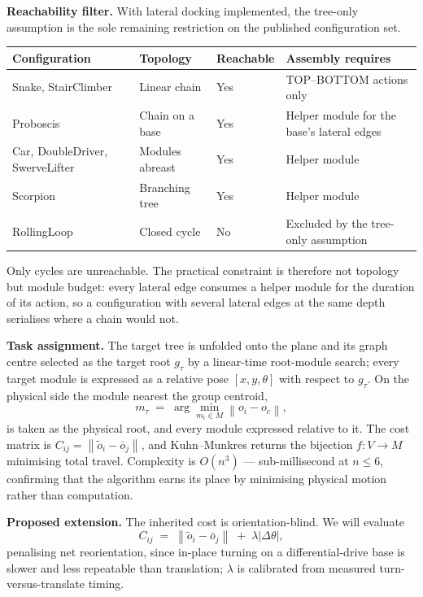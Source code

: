 \documentclass[11pt,a4paper]{article}
\newif\ifreview
\newcommand{\pending}[1]{\ifreview{\color{blue}#1}\else#1\fi}
\newenvironment{pblock}{\ifreview\color{blue}\fi}{}
\begin{document}
\medskip
\noindent\textbf{Reachability filter.} With lateral docking implemented, the
tree-only assumption is the sole remaining restriction on the published
configuration set.

\begin{pblock}
\begin{longtable}{@{}L{0.28\textwidth} L{0.20\textwidth} l L{0.30\textwidth}@{}}
\toprule
\textbf{Configuration} & \textbf{Topology} & \textbf{Reachable} &
\textbf{Assembly requires} \\
\midrule
\endhead
Snake, StairClimber & Linear chain & Yes &
  TOP--BOTTOM actions only \\
Proboscis & Chain on a base & Yes &
  Helper module for the base's lateral edges \\
Car, DoubleDriver, SwerveLifter & Modules abreast & Yes &
  Helper module \\
Scorpion & Branching tree & Yes &
  Helper module \\
RollingLoop & Closed cycle & No &
  Excluded by the tree-only assumption \\
\bottomrule
\end{longtable}
\end{pblock}

\pending{%
\noindent Only cycles are unreachable. The practical constraint is therefore
not topology but module budget: every lateral edge consumes a helper module for
the duration of its action, so a configuration with several lateral edges at
the same depth serialises where a chain would not.
}

\medskip
\noindent\textbf{Task assignment.} The target tree is unfolded onto the plane
and its graph centre selected as the target root $g_\tau$ by a linear-time
root-module search; every target module is expressed as a relative pose
$[x, y, \theta]$ with respect to $g_\tau$. On the physical side the module
nearest the group centroid,
\begin{equation}
  m_\tau \;=\; \arg\min_{m_i \in M} \left\| o_i - o_c \right\|,
\end{equation}
is taken as the physical root, and every module expressed relative to it. The
cost matrix is $C_{ij} = \left\| \tilde{o}_i - \bar{o}_j \right\|$, and
Kuhn--Munkres returns the bijection $f : V \rightarrow M$ minimising total
travel. Complexity is $O(n^3)$ --- sub-millisecond at $n \leq 6$, confirming
that the algorithm earns its place by minimising physical motion rather than
computation.

\noindent\textbf{Proposed extension.} The inherited cost is orientation-blind.
We will evaluate
\begin{equation}
  C_{ij} \;=\; \left\| \tilde{o}_i - \bar{o}_j \right\|
              \;+\; \lambda \left| \Delta\theta \right|,
\end{equation}
penalising net reorientation, since in-place turning on a differential-drive
base is slower and less repeatable than translation; $\lambda$ is calibrated
from measured turn-versus-translate timing.
\end{document}

